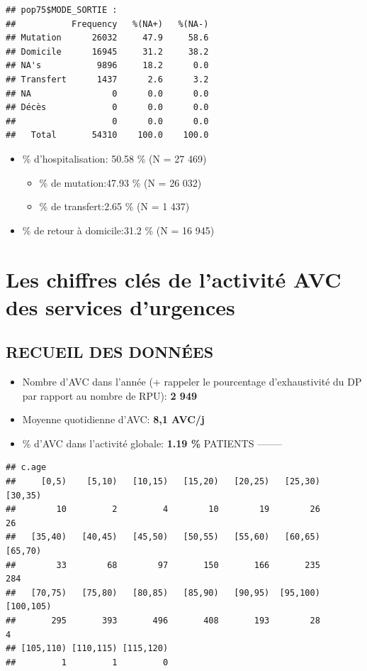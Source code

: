 \documentclass[]{article}
\begin{document}
\begin{verbatim}
## pop75$MODE_SORTIE : 
##           Frequency   %(NA+)   %(NA-)
## Mutation      26032     47.9     58.6
## Domicile      16945     31.2     38.2
## NA's           9896     18.2      0.0
## Transfert      1437      2.6      3.2
## NA                0      0.0      0.0
## Décès             0      0.0      0.0
##                   0      0.0      0.0
##   Total       54310    100.0    100.0
\end{verbatim}

\begin{itemize}
\itemsep1pt\parskip0pt
\item
  \% d'hospitalisation: 50.58 \% (N = 27 469)

  \begin{itemize}
  \itemsep1pt\parskip0pt
  \item
    \% de mutation:47.93 \% (N = 26 032)
  \item
    \% de transfert:2.65 \% (N = 1 437)
  \end{itemize}
\item
  \% de retour à domicile:31.2 \% (N = 16 945)
\end{itemize}

\section{Les chiffres clés de l'activité AVC des services
d'urgences}\label{les-chiffres-cles-de-lactivite-avc-des-services-durgences}

\subsection{RECUEIL DES DONNÉES}\label{recueil-des-donnees-3}

\begin{itemize}
\itemsep1pt\parskip0pt
\item
  Nombre d'AVC dans l'année (+ rappeler le pourcentage d'exhaustivité du
  DP par rapport au nombre de RPU): \textbf{2 949}
\item
  Moyenne quotidienne d'AVC: \textbf{8,1 AVC/j}
\item
  \% d'AVC dans l'activité globale: \textbf{1.19 \%} PATIENTS --------
\end{itemize}

\begin{verbatim}
## c.age
##     [0,5)    [5,10)   [10,15)   [15,20)   [20,25)   [25,30)   [30,35) 
##        10         2         4        10        19        26        26 
##   [35,40)   [40,45)   [45,50)   [50,55)   [55,60)   [60,65)   [65,70) 
##        33        68        97       150       166       235       284 
##   [70,75)   [75,80)   [80,85)   [85,90)   [90,95)  [95,100) [100,105) 
##       295       393       496       408       193        28         4 
## [105,110) [110,115) [115,120) 
##         1         1         0
\end{verbatim}
\end{document}
